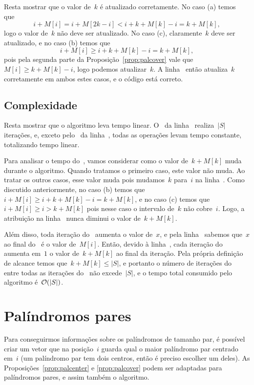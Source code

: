 Resta mostrar que o valor de~$k$ é atualizado corretamente. No caso (a) temos que~$$i + M[i] = i + M[2k - i] < i + k + M[k] - i = k + M[k],$$ logo o valor de~$k$ não deve ser atualizado.
No caso (c), claramente~$k$ deve ser atualizado, e no caso (b) temos que~$$i + M[i] \geq i + k + M[k] - i = k + M[k],$$ pois pela segunda parte da Proposição~\ref{prop:palcover} vale que~${M[i] \geq k + M[k] - i}$, logo podemos atualizar~$k$. A linha~ então atualiza~$k$ corretamente em ambos estes casos, e o código está correto.

\subsection{Complexidade}
Resta mostrar que o algoritmo leva tempo linear. O~ da linha~ realiza~$|S|$ iterações, e, exceto pelo~ da linha~, todas as operações levam tempo constante, totalizando tempo linear.

Para analisar o tempo do~, vamos considerar como o valor de~${k + M[k]}$ muda durante o algoritmo. Quando tratamos o primeiro caso, este valor não muda.
Ao tratar os outros casos, esse valor muda pois mudamos~$k$ para~$i$ na linha~. Como discutido anteriormente, no caso (b) temos que~${i + M[i] \geq i + k + M[k] - i = k + M[k]}$, e no caso (c) temos que~${i + M[i] \geq i > k + M[k]}$ pois nesse caso o intervalo de~$k$ não cobre~$i$. Logo, a atribuição na linha~ nunca diminui o valor de~${k + M[k]}$.

Além disso, toda iteração do~ aumenta o valor de~$x$, e pela linha~ sabemos que~$x$ ao final do~ é o valor de~$M[i]$. Então, devido à linha~, cada iteração do~ aumenta em~$1$ o valor de~$k + M[k]$ ao final da iteração. Pela própria definição de alcance temos que~$k + M[k] \leq |S|$, e portanto o número de iterações do~ entre todas as iterações do~ não excede~$|S|$, e o tempo total consumido pelo algoritmo é~$\mathcal{O}(|S|)$.

\section{Palíndromos pares}
Para conseguirmos informações sobre os palíndromos de tamanho par, é possível criar um vetor que na posição~$i$ guarda qual o maior palíndromo par centrado em~$i$ (um palíndromo par tem dois centros, então é preciso escolher um deles). As Proposições~\ref{prop:palcenter} e \ref{prop:palcover} podem ser adaptadas para palíndromos pares, e assim também o algoritmo.

